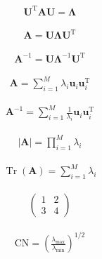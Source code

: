 \documentclass{article}
\begin{document}
\begin{align*}
\mathbf{U}^{\mathrm{T}} \mathbf{A} \mathbf{U} = \boldsymbol{\Lambda}
\tag{A.42}
\end{align*}

\begin{align*}
\mathbf{A} = \mathbf{U} \boldsymbol{\Lambda} \mathbf{U}^{\mathrm{T}}
\tag{A.43}
\end{align*}

\begin{align*}
\mathbf{A}^{-1} = \mathbf{U} \boldsymbol{\Lambda}^{-1} \mathbf{U}^{\mathrm{T}}
\tag{A.44}
\end{align*}

\begin{align*}
\mathbf{A} = \sum_{i=1}^{M} \lambda_{i} \mathbf{u}_{i} \mathbf{u}_{i}^{\mathrm{T}}
\tag{A.45}
\end{align*}

\begin{align*}
\mathbf{A}^{-1} = \sum_{i=1}^{M} \frac{1}{\lambda_{i}} \mathbf{u}_{i} \mathbf{u}_{i}^{\mathrm{T}}
\tag{A.46}
\end{align*}

\begin{align*}
|\mathbf{A}| = \prod_{i=1}^{M} \lambda_{i}
\tag{A.47}
\end{align*}

\begin{align*}
\operatorname{Tr}(\mathbf{A}) = \sum_{i=1}^{M} \lambda_{i}
\tag{A.48}
\end{align*}

\begin{align*}
\left(\begin{array}{ll}
1 & 2 \\
3 & 4
\end{array}\right)
\tag{A.49}
\end{align*}

\begin{align*}
\mathrm{CN} = \left(\frac{\lambda_{\max }}{\lambda_{\min }}\right)^{1 / 2}
\tag{A.50}
\end{align*}
\end{document}
